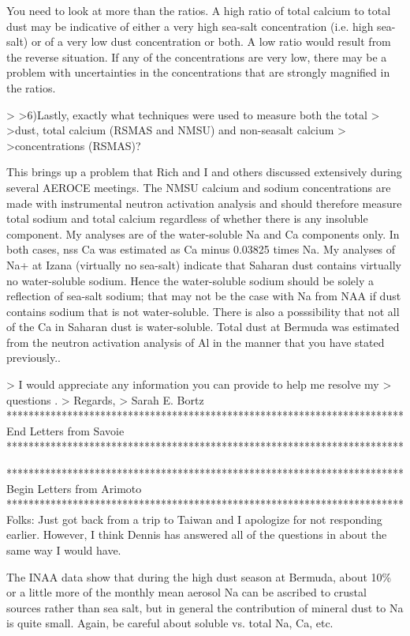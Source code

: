 \documentclass[final,dvips]{foils}
\begin{document}
{You need to look at more than the ratios.  A high ratio of total
calcium to total dust may be indicative of either a very high sea-salt
concentration (i.e. high sea-salt) or of a very low dust concentration
or both.  A low ratio would result from the reverse situation.  If any
of the concentrations are very low, there may be a problem with
uncertainties in the concentrations that are strongly magnified in the
ratios. 

> >6)Lastly, exactly what techniques were used to measure both the total
> >dust, total calcium (RSMAS and NMSU) and non-seasalt calcium
> >concentrations (RSMAS)?

This brings up a problem that Rich and I and others discussed
extensively during several AEROCE meetings.  The NMSU calcium and
sodium concentrations are made with instrumental neutron activation
analysis and should therefore measure total sodium and total calcium
regardless of whether there is any insoluble component.  My analyses
are of the water-soluble Na and Ca components only.  In both cases,
nss Ca was estimated as Ca minus 0.03825 times Na.  My analyses of Na+
at Izana (virtually no sea-salt) indicate that Saharan dust contains
virtually no water-soluble sodium.  Hence the water-soluble sodium
should be solely a reflection of sea-salt sodium; that may not be the
case with Na from NAA if dust contains sodium that is not
water-soluble.  There is also a posssibility that not all of the Ca in
Saharan dust is water-soluble. 
Total dust at Bermuda was estimated from the neutron activation
analysis of Al in the manner that you have stated previously.. 

> I would appreciate any information you can provide to help me resolve my
> questions .
> Regards,
> Sarah E. Bortz
************************************************************************
End Letters from Savoie
************************************************************************

************************************************************************
Begin Letters from Arimoto
************************************************************************
Folks: Just got back from a trip to Taiwan and I apologize for not
responding earlier.  However, I think Dennis has answered all of the
questions in about the same way I would have. 

The INAA data show that during  the high dust season at Bermuda, about
10\% or a little more of the monthly mean aerosol Na can be ascribed to
crustal sources rather than sea salt, but in general the
contribution of mineral dust to Na is quite small.  Again, be
careful about soluble vs. total Na, Ca, etc. 

}
\end{document}

